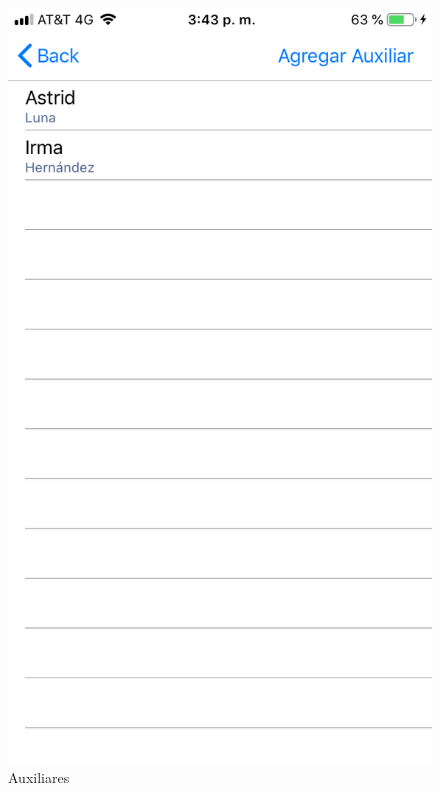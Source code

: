 \begin{enumerate}
	\begin{figure}[!htbp]			
		\hypertarget{fig:Auxiliares4}{\hspace{1pt}}
		\begin{center}
			\includegraphics[height=0.4\textheight]{Paciente/EliminarAuxiliar/images/Auxiliares}
			\caption{Auxiliares}
			\label{fig:Auxiliares4}
		\end{center}
	\end{figure}


\end{enumerate}

